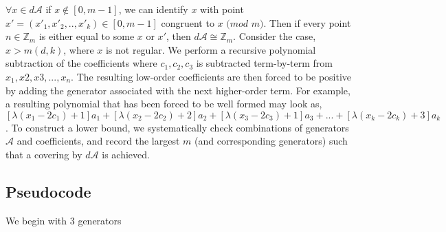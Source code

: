 \begin{centering}
\begin{block}
{$\forall x \in d \mathcal{A}$ if $x \notin [0, m-1]$, we can identify $x$ with point $x' = (x'_{1}, x'_{2}, .. , x'_{k}) \in [0, m-1]$ congruent to $x$ $(mod$ $m)$.  Then if every point $n \in \mathbb{Z}_{m}$ is either equal to some $x$ or $x'$, then $d \mathcal{A} \cong \mathbb{Z}_m$.\n
Consider the case, $x > m(d, k)$, where $x$ is not regular. We perform a recursive polynomial subtraction of the coefficients where $c_{1}, c_{2}, c_{3}$ is subtracted term-by-term from $x_{1}, x{2}, x{3}, ... , x_{n}$. The resulting low-order coefficients are then forced to be positive by adding the generator associated with the next higher-order term.\n
For example, a resulting polynomial that has been forced to be well formed may look as, $[\lambda(x_{1} - 2 c_{1}) + 1]a_{1} + [\lambda(x_{2} - 2 c_{2}) + 2]a_{2} + [\lambda(x_{3} - 2 c_{3}) + 1]a_{3} + ... + [\lambda(x_{k} - 2 c_{k}) + 3]a_{k}$.\n
To construct a lower bound, we systematically check combinations of generators $\mathcal{A}$ and coefficients, and record the largest $m$ (and corresponding generators) such that a covering by $d \mathcal{A}$ is achieved.}
\end{block}
\end{centering}

\pagebreak
\subsection{Pseudocode}
We begin with 3 generators
\vspace{3mm}

